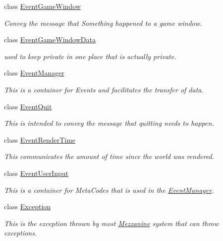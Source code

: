 \begin{DoxyCompactItemize}
class \hyperlink{classMezzanine_1_1EventGameWindow}{EventGameWindow}
\begin{DoxyCompactList}\small\item\em Convey the message that Something happened to a game window. \item\end{DoxyCompactList}\item 
class \hyperlink{classMezzanine_1_1EventGameWindowData}{EventGameWindowData}
\begin{DoxyCompactList}\small\item\em used to keep private in one place that is actually private. \item\end{DoxyCompactList}\item 
class \hyperlink{classMezzanine_1_1EventManager}{EventManager}
\begin{DoxyCompactList}\small\item\em This is a container for Events and facilitates the transfer of data. \item\end{DoxyCompactList}\item 
class \hyperlink{classMezzanine_1_1EventQuit}{EventQuit}
\begin{DoxyCompactList}\small\item\em This is intended to convey the message that quitting needs to happen. \item\end{DoxyCompactList}\item 
class \hyperlink{classMezzanine_1_1EventRenderTime}{EventRenderTime}
\begin{DoxyCompactList}\small\item\em This communicates the amount of time since the world was rendered. \item\end{DoxyCompactList}\item 
class \hyperlink{classMezzanine_1_1EventUserInput}{EventUserInput}
\begin{DoxyCompactList}\small\item\em This is a container for MetaCodes that is used in the \hyperlink{classMezzanine_1_1EventManager}{EventManager}. \item\end{DoxyCompactList}\item 
class \hyperlink{classMezzanine_1_1Exception}{Exception}
\begin{DoxyCompactList}\small\item\em This is the exception thrown by most \hyperlink{namespaceMezzanine}{Mezzanine} system that can throw exceptions. \item\end{DoxyCompactList}\item 

\end{DoxyCompactItemize}
